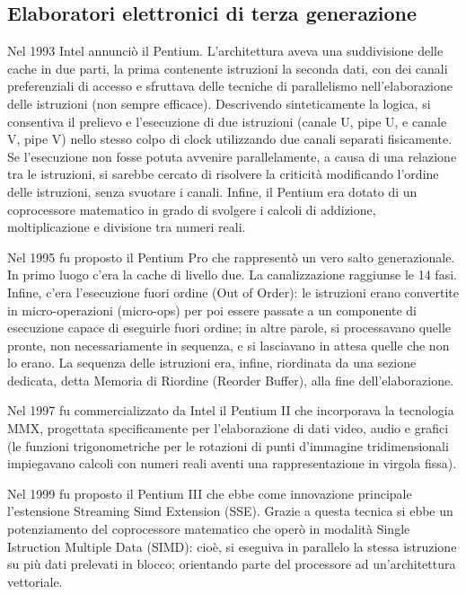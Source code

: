 \documentclass[12pt]{article} %
\begin{document}
\subsection{Elaboratori elettronici di terza generazione}
Nel 1993 Intel annunciò il Pentium. L’architettura aveva una suddivisione delle cache in due parti, la prima contenente istruzioni la seconda dati, con dei canali preferenziali di accesso e sfruttava delle tecniche di parallelismo nell’elaborazione delle istruzioni (non sempre efficace). Descrivendo sinteticamente la logica, si consentiva il prelievo e l’esecuzione di due istruzioni (canale U, pipe U, e canale V, pipe V) nello stesso colpo di clock utilizzando due canali separati fisicamente. Se l’esecuzione non fosse potuta avvenire parallelamente, a causa di una relazione tra le istruzioni, si sarebbe cercato di risolvere la criticità modificando l’ordine delle istruzioni, senza svuotare i canali. Infine, il Pentium era dotato di un coprocessore matematico in grado di svolgere i calcoli di addizione, moltiplicazione e divisione tra numeri reali.\par\medskip\noindent
Nel 1995 fu proposto il Pentium Pro che rappresentò un vero salto generazionale. In primo luogo c’era la cache di livello due. La canalizzazione raggiunse le 14 fasi. Infine, c’era l’esecuzione fuori ordine (Out of Order): le istruzioni erano convertite in micro-operazioni (micro-ops) per poi essere passate a un componente di esecuzione capace di eseguirle fuori ordine; in altre parole, si processavano quelle pronte, non necessariamente in sequenza, e si lasciavano in attesa quelle che non lo erano. La sequenza delle istruzioni era, infine, riordinata da una sezione dedicata, detta Memoria di Riordine (Reorder Buffer), alla fine dell’elaborazione. \par\medskip\noindent
Nel 1997 fu commercializzato da Intel il Pentium II che incorporava la tecnologia MMX, progettata specificamente per l’elaborazione di dati video, audio e grafici (le funzioni trigonometriche per le rotazioni di punti d’immagine tridimensionali impiegavano calcoli con numeri reali aventi una rappresentazione in virgola fissa).\par\medskip\noindent
Nel 1999 fu proposto il Pentium III che ebbe come innovazione principale l’estensione Streaming Simd Extension (SSE). Grazie a questa tecnica si ebbe un potenziamento del coprocessore matematico che operò in modalità Single Istruction Multiple Data (SIMD): cioè, si eseguiva in parallelo la stessa istruzione su più dati prelevati in blocco; orientando parte del processore ad un’architettura vettoriale.\par\medskip\noindent
\end{document}
